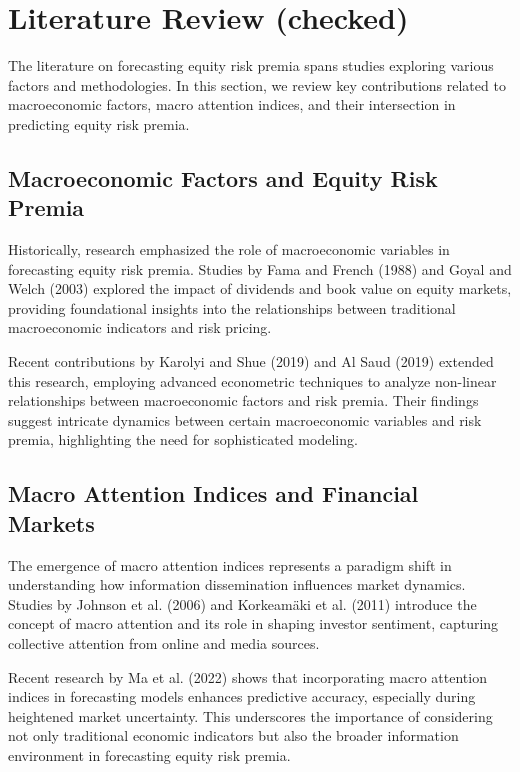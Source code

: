 \documentclass{article}
\begin{document}
\section{Literature Review (checked)}

The literature on forecasting equity risk premia spans studies exploring various factors and methodologies. In this section, we review key contributions related to macroeconomic factors, macro attention indices, and their intersection in predicting equity risk premia.

\subsection{Macroeconomic Factors and Equity Risk Premia}

Historically, research emphasized the role of macroeconomic variables in forecasting equity risk premia. Studies by Fama and French (1988) and Goyal and Welch (2003) explored the impact of dividends and book value on equity markets, providing foundational insights into the relationships between traditional macroeconomic indicators and risk pricing.

Recent contributions by Karolyi and Shue (2019) and Al Saud (2019) extended this research, employing advanced econometric techniques to analyze non-linear relationships between macroeconomic factors and risk premia. Their findings suggest intricate dynamics between certain macroeconomic variables and risk premia, highlighting the need for sophisticated modeling.

\subsection{Macro Attention Indices and Financial Markets}

The emergence of macro attention indices represents a paradigm shift in understanding how information dissemination influences market dynamics. Studies by Johnson et al. (2006) and Korkeamäki et al. (2011) introduce the concept of macro attention and its role in shaping investor sentiment, capturing collective attention from online and media sources.

Recent research by Ma et al. (2022) shows that incorporating macro attention indices in forecasting models enhances predictive accuracy, especially during heightened market uncertainty. This underscores the importance of considering not only traditional economic indicators but also the broader information environment in forecasting equity risk premia.
\end{document}
